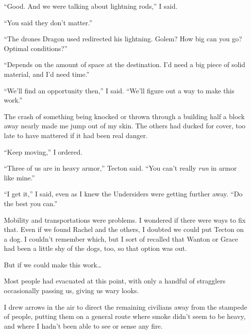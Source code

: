 ``Good.  And we were talking about lightning rods,'' I said.



``You said they don't matter.''



``The drones Dragon used redirected his lightning.  Golem?  How big can you go?  Optimal conditions?''



``Depends on the amount of space at the destination.  I'd need a big piece of solid material, and I'd need time.''



``We'll find an opportunity then,'' I said.  ``We'll figure out a way to make this work.''



The crash of something being knocked or thrown through a building half a block away nearly made me jump out of my skin.  The others had ducked for cover, too late to have mattered if it had been real danger.



``Keep moving,'' I ordered.



``Three of us are in heavy armor,'' Tecton said.  ``You can't really \emph{run} in armor like mine.''



``I get it,'' I said, even as I knew the Undersiders were getting further away.  ``Do the best you can.''



Mobility and transportations were problems.  I wondered if there were ways to fix that.  Even if we found Rachel and the others, I doubted we could put Tecton on a dog.  I couldn't remember which, but I sort of recalled that Wanton or Grace had been a little shy of the dogs, too, so that option was out.



But if we could make this work\ldots



Most people had evacuated at this point, with only a handful of stragglers occasionally passing us, giving us wary looks.



I drew arrows in the air to direct the remaining civilians away from the stampede of people, putting them on a general route where smoke didn't seem to be heavy, and where I hadn't been able to see or sense any fire.



